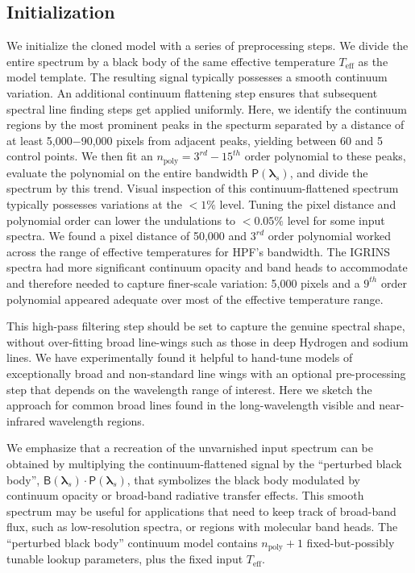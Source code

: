 \documentclass[modern]{aastex631}
\begin{document}
\subsection{Initialization}

We initialize the cloned model with a series of preprocessing steps. We divide the entire spectrum by a black body of the same effective temperature $T_{\mathrm{eff}}$ as the model template. The resulting signal typically possesses a smooth continuum variation. An additional continuum flattening step ensures that subsequent spectral line finding steps get applied uniformly. Here, we identify the continuum regions by the most prominent peaks in the specturm separated by a distance of at least 5,000$-$90,000 pixels from adjacent peaks, yielding between 60 and 5 control points. We then fit an $n_{\mathrm{poly}} = 3^{rd}-15^{th}$ order polynomial to these peaks, evaluate the polynomial on the entire bandwidth $\mathsf{P}(\bm{\lambda}_s)$, and divide the spectrum by this trend. Visual inspection of this continuum-flattened spectrum typically possesses variations at the $<1\%$ level. Tuning the pixel distance and polynomial order can lower the undulations to $<0.05\%$ level for some input spectra. We found a pixel distance of 50,000 and $3^{rd}$ order polynomial worked across the range of effective temperatures for HPF's bandwidth. The IGRINS spectra had more significant continuum opacity and band heads to accommodate and therefore needed to capture finer-scale variation: 5,000 pixels and a $9^{th}$ order polynomial appeared adequate over most of the effective temperature range.

This high-pass filtering step should be set to capture the genuine spectral shape, without over-fitting broad line-wings such as those in deep Hydrogen and sodium lines. We have experimentally found it helpful to hand-tune models of exceptionally broad and non-standard line wings with an optional pre-processing step that depends on the wavelength range of interest. Here we sketch the approach for common broad lines found in the long-wavelength visible and near-infrared wavelength regions.


We emphasize that a recreation of the unvarnished input spectrum can be obtained by multiplying the continuum-flattened signal by the ``perturbed black body'', $\mathsf{B}(\bm{\lambda}_s)\cdot \mathsf{P}(\bm{\lambda}_s)$, that symbolizes the black body modulated by continuum opacity or broad-band radiative transfer effects. This smooth spectrum may be useful for applications that need to keep track of broad-band flux, such as low-resolution spectra, or regions with molecular band heads. The ``perturbed black body'' continuum model contains $n_{\mathrm{poly}}+1$ fixed-but-possibly tunable lookup parameters, plus the fixed input $T_{\mathrm{eff}}$.
\end{document}
